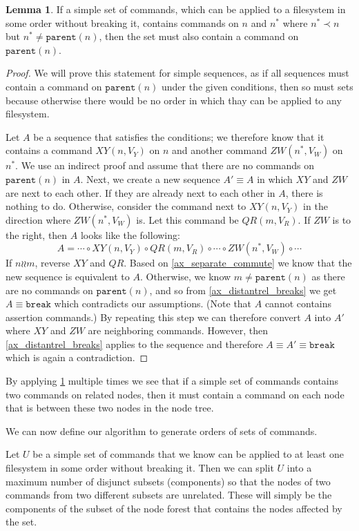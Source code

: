 \documentclass[12pt]{article}
\newcommand{\parent}{\mathtt{parent}}
\newcommand{\nn}{n^*} %
\newcommand{\cbrk}{\mathtt{break}} %
\newcommand{\fscommand}[2]{{#1#2}}
\newcommand{\cxy}{\fscommand{X}{Y}}
\newcommand{\czw}{\fscommand{Z}{W}}
\newcommand{\cqr}{\fscommand{Q}{R}}
\newcommand{\cc}{\circ} %
\newcommand{\descendant}{\prec}
\newcommand{\indep}{\mathrel{\wr\wr}} %
\newcommand{\unrel}{\indep} %
\theoremstyle{definition}
\newtheorem{mylem}{Lemma}
\begin{document}
\begin{mylem}\label{connected_changes}
If a simple set of commands, which can be applied to a filesystem in some order without breaking it,
contains commands on $n$ and $\nn$ where $\nn\descendant n$
but $\nn\neq\parent(n)$, then the set must also contain a command on $\parent(n)$.
\end{mylem}
\begin{proof}
We will prove this statement for simple sequences, as if all sequences must contain a command on $\parent(n)$
under the given conditions, then so must sets because otherwise there would be no order in which thay can be
applied to any filesystem.

Let $A$ be a sequence that satisfies the conditions;
we therefore know that it contains a command $\cxy(n,V_Y)$ on $n$
and another command $\czw(\nn,V_W)$ on $\nn$.
We use an indirect proof and assume that there are no commands on $\parent(n)$ in $A$.
Next, we create a new sequence $A'\equiv A$ in which $\cxy$ and $\czw$ are next to each other.
If they are already next to each other in $A$, there is nothing to do.
Otherwise, consider the command next to $\cxy(n,V_Y)$ in the direction where $\czw(\nn,V_W)$ is.
Let this command be $\cqr(m,V_R)$.
If $\czw$ is to the right, then $A$ looks like the following:
\[ A = \cdots\cc\cxy(n,V_Y)\cc\cqr(m,V_R)\cc\cdots\cc\czw(\nn,V_W)\cc\cdots \]
If $n\unrel m$, reverse $\cxy$ and $\cqr$. Based on \cref{ax_separate_commute} we know that the new
sequence is equivalent to $A$.
Otherwise, we know $m\neq\parent(n)$ as there are no commands on $\parent(n)$, and so
from \cref{ax_distantrel_breaks} we get $A\equiv\cbrk$ which contradicts our assumptions.
(Note that $A$ cannot contains assertion commands.)
By repeating this step we can therefore convert $A$ into $A'$ where $\cxy$ and $\czw$ are neighboring commands.
However, then \cref{ax_distantrel_breaks} applies to the sequence and therefore $A\equiv A'\equiv\cbrk$ which
is again a contradiction.
\end{proof}

By applying \cref{connected_changes} multiple times we see that if a simple set of commands
contains two commands on related nodes, then it must contain a command on each
node that is between these two nodes in the node tree.

\medskip

We can now define our algorithm to generate orders of sets of commands.

Let $U$ be a simple set of commands
that we know can be applied to at least one filesystem in some order without breaking it.
Then we can split $U$ into a maximum number of disjunct subsets
(components) so that the nodes of two commands from two different subsets are unrelated.
These will simply be the components of the subset of the node forest that contains the nodes affected by the set.
\end{document}
